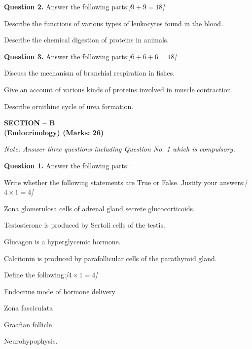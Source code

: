 \documentclass[11pt,a4paper]{article}
\newcommand{\pts}[1]{\hfill   \textit{[#1]}}
\begin{document}
\medskip


\noindent   \textbf{Question 2.} Answer the following parts:\pts{$9 + 9 = 18$}

\begin{parts}
  \item Describe the functions of various types of leukocytes found in the blood.
  \item Describe the chemical digestion of proteins in animals.
\end{parts}

\medskip


\noindent   \textbf{Question 3.} Answer the following parts:\pts{$6 + 6 + 6 = 18$}

\begin{parts}
  \item Discuss the mechanism of branchial respiration in fishes.
  \item Give an account of various kinds of proteins involved in muscle contraction.
  \item Describe ornithine cycle of urea formation.
\end{parts}

\pagebreak

\begin{center}
   \textbf{SECTION -- B} \\
   \textbf{(Endocrinology) (Marks: 26)}
\end{center}

\smallskip



\noindent   \textit{Note: Answer three questions including Question No. 1 which is compulsory.}

\medskip


\noindent   \textbf{Question 1.} Answer the following parts:

\begin{parts}
  \item Write whether the following statements are True or False. Justify your answers:\pts{$4  \times 1 = 4$}
  
\begin{parts}
    \item Zona glomerulosa cells of adrenal gland secrete glucocorticoids.
    \item Testosterone is produced by Sertoli cells of the testis.
    \item Glucagon is a hyperglycemic hormone.
    \item Calcitonin is produced by parafollicular cells of the parathyroid gland.
  \end{parts}

  \item Define the following:\pts{$4  \times 1 = 4$}
  
\begin{parts}
    \item Endocrine mode of hormone delivery
    \item Zona fasciculata
    \item Graafian follicle
    \item Neurohypophysis.
  \end{parts}
\end{parts}
\end{document}
